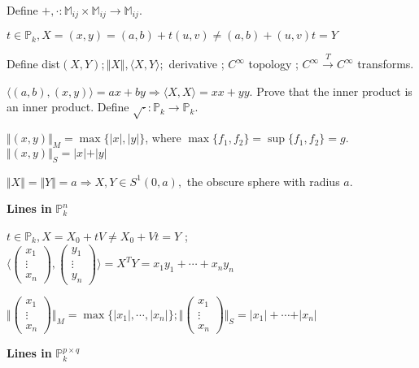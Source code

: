 \documentclass[10pt,a4paper]{article}
\begin{document}
Define $+, \cdot : \mathbb{M}_{ij} \times \mathbb{M}_{ij} \rightarrow \mathbb{M}_{ij} $.

$t \in \mathbb{P}_k, X = (x,y) = (a,b) + t (u,v) \neq (a,b) + (u, v) t = Y$

Define dist$(X, Y) ; \Vert X \Vert, \langle X, Y \rangle ; $ derivative ; $C^\infty$ topology ; $C^\infty \stackrel{T}{\rightarrow} C^\infty $ transforms.

$\langle (a,b), (x,y) \rangle = ax + by \Rightarrow \langle X, X \rangle = xx + yy$. Prove that the inner product is an inner product. Define $\sqrt{\cdot} : \mathbb{P}_k \rightarrow \mathbb{P}_k$.

$\Vert (x,y) \Vert_M = \max \{ \vert x \vert, \vert y \vert \}$, where $\max \{ f_1, f_2 \} = \sup \{ f_1, f_2 \} = g$. $\Vert (x,y) \Vert_S =  \vert x \vert + \vert y \vert$

$\Vert X \Vert = \Vert Y \Vert = a \Rightarrow X, Y \in S^1(0, a),$ the obscure sphere with radius $a$.

\vspace{3mm}

\textbf{Lines in }$\mathbb{P}_k^n$

$t \in \mathbb{P}_k, X = X_0 + t V \neq X_0 + V t = Y$ ; $\biggl\langle \begin{pmatrix} x_1 \\ \vdots \\ x_n \end{pmatrix}, \begin{pmatrix} y_1 \\ \vdots \\ y_n \end{pmatrix} \biggl\rangle = X^T Y = x_1 y_1 + \cdots + x_n y_n$

$\biggl\Vert \begin{pmatrix} x_1 \\ \vdots \\ x_n \end{pmatrix} \biggl\Vert_M = \max \{ \vert x_1 \vert, \cdots, \vert x_n \vert \} ; \biggl\Vert \begin{pmatrix} x_1 \\ \vdots \\ x_n \end{pmatrix} \biggl\Vert_S = \vert x_1 \vert + \cdots + \vert x_n \vert $

\vspace{3mm}

\textbf{Lines in }$\mathbb{P}_k^{p \times q}$
\end{document}
